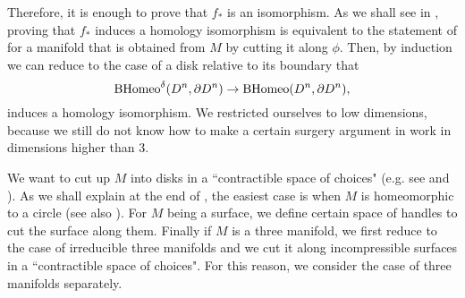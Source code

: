 \documentclass[a4paper]{amsart}
\theoremstyle{definition}
\theoremstyle{remark}
\newcommand{\BH}{\mathrm{B}\text{\textnormal{Homeo}}}
\newcommand{\BdH}{\mathrm{B}\text{\textnormal{Homeo}}^{\delta}}
\numberwithin{equation}{section}
\begin{document}
 Therefore, it is enough to prove that $f_*$ is an  isomorphism.  As we shall see in , proving that $f_*$ induces a homology isomorphism is equivalent to the statement of  for a manifold that is obtained from $M$ by cutting it along $\phi$. Then, by induction we can reduce  to the case of a disk relative to its boundary that
\[
\BdH(D^n,\partial D^n)\to \BH(D^n,\partial D^n),
\]
induces a homology isomorphism. We restricted ourselves to low dimensions, because we still do not know how to make a certain surgery argument in  work in  dimensions higher than $3$. 


 We want to cut up $M$ into disks in a ``contractible space of choices" (e.g. see  and ). As we shall explain at the end of , the easiest case is when $M$ is homeomorphic to a circle (see also \cite[Theorem 4]{MR2871163}). For $M$ being a surface, we define certain space of handles to cut the surface along them. Finally if $M$ is a three manifold, we first reduce to the case of irreducible three manifolds and we cut it along incompressible surfaces in a ``contractible space of choices". For this reason, we consider the case of three manifolds separately.
\end{document}
